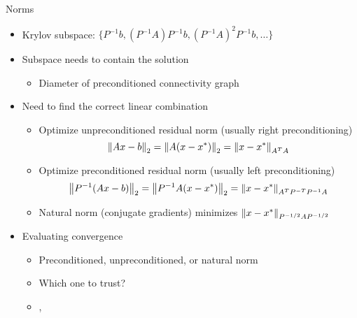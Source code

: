 \begin{frame}{Norms}
  \begin{itemize}
  \item Krylov subspace: $\{P^{-1}b,(P^{-1}A)P^{-1}b,(P^{-1}A)^2P^{-1}b,\dotsc\}$
  \item Subspace needs to contain the solution
    \begin{itemize}
    \item Diameter of preconditioned connectivity graph
    \end{itemize}
  \item Need to find the correct linear combination
    \begin{itemize}
    \item Optimize unpreconditioned residual norm (usually right preconditioning)
      \begin{equation*}
        \left\lVert A x - b \right\rVert_2 = \left\lVert A (x - x^*) \right\rVert_2 = \left\lVert x-x^* \right\rVert_{A^T A}
      \end{equation*}
    \item Optimize preconditioned residual norm (usually left preconditioning)
      \begin{equation*}
        \left\lVert P^{-1} (A x - b) \right\rVert_2 = \left\lVert P^{-1}A (x - x^*) \right\rVert_2 = \left\lVert x-x^* \right\rVert_{A^T P^{-T} P^{-1} A}
      \end{equation*}
    \item Natural norm (conjugate gradients) minimizes $\left\lVert x-x^* \right\rVert_{P^{-1/2}AP^{-1/2}}$
    \end{itemize}
  \item Evaluating convergence
    \begin{itemize}
    \item Preconditioned, unpreconditioned, or natural norm
    \item Which one to trust?
    \item {}, 
    \end{itemize}
  \end{itemize}
\end{frame}

